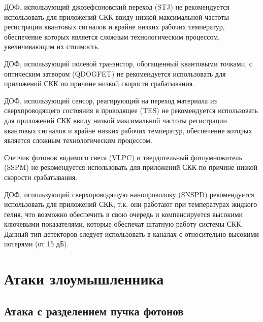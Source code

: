 ДОФ, использующий джозефсоновский переход (STJ) не рекомендуется использовать для приложений СКК ввиду низкой максимальной частоты регистрации квантовых сигналов и крайне низких рабочих температур, обеспечение которых является сложным технологическим процессом, увеличивающим их стоимость.


ДОФ, использующий полевой транзистор, обогащенный квантовыми точками, с оптическим затвором (QDOGFET) не рекомендуется использовать для приложений СКК по причине низкой скорости срабатывания.


ДОФ, использующий сенсор, реагирующий на переход материала из сверхпроводящего состояния в проводящее (TES) не рекомендуется использовать для приложений СКК ввиду низкой максимальной частоты регистрации квантовых сигналов и крайне низких рабочих температур, обеспечение которых является сложным технологическим процессом.


Счетчик фотонов видимого света (VLPC) и твердотельный фотоумножитель (SSPM) не рекомендуется использовать для приложений СКК по причине низкой скорости срабатывания.


ДОФ, использующий сверхпроводящую нанопроволоку (SNSPD) рекомендуется использовать для приложений СКК, т.\:к. они работают при температурах жидкого гелия, что возможно обеспечить в свою очередь и компенсируется высокими ключевыми показателями, которые обеспечат штатную работу системы СКК. Данный тип детекторов следует использовать в каналах с относительно высокими потерями (от 15 дБ). 


\section{Атаки злоумышленника} \label{sec:ch1/sec6} 


\subsection{Атака с разделением пучка фотонов}  \label{subsec:ch1/sec6/sub1}


